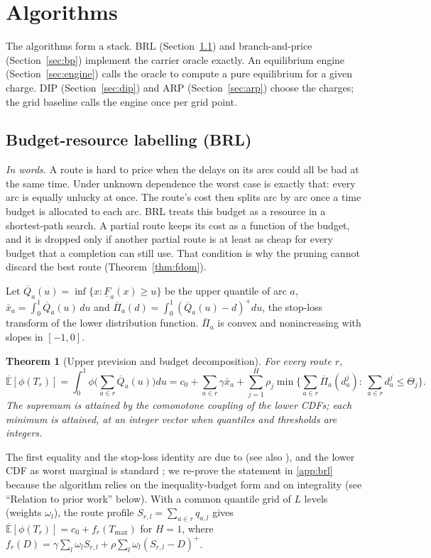 \documentclass[preprint,12pt]{elsarticle}
\newtheorem{theorem}{Theorem}
\theoremstyle{definition}
\theoremstyle{remark}
\newcommand{\Eu}{\overline{\mathbb{E}}}
\newcommand{\Qb}{\overline{Q}}
\newcommand{\Fl}{\underline{F}}
\newcommand{\Pib}{\overline{\Pi}}
\newcommand{\xb}{\bar x}
\newcommand{\pos}[1]{\left(#1\right)^{+}}
\begin{document}
\section{Algorithms}\label{sec:algo}

The algorithms form a stack. BRL (Section~\ref{sec:brl}) and branch-and-price (Section~\ref{sec:bp}) implement the carrier oracle exactly. An equilibrium engine (Section~\ref{sec:engine}) calls the oracle to compute a pure equilibrium for a given charge. DIP (Section~\ref{sec:dip}) and ARP (Section~\ref{sec:arp}) choose the charges; the grid baseline calls the engine once per grid point.

\subsection{Budget-resource labelling (BRL)}\label{sec:brl}

\emph{In words.} A route is hard to price when the delays on its arcs could all be bad at the same time. Under unknown dependence the worst case is exactly that: every arc is equally unlucky at once. The route's cost then splits arc by arc once a time budget is allocated to each arc. BRL treats this budget as a resource in a shortest-path search. A partial route keeps its cost as a function of the budget, and it is dropped only if another partial route is at least as cheap for every budget that a completion can still use. That condition is why the pruning cannot discard the best route (Theorem~\ref{thm:fdom}).

Let $\Qb_a(u)=\inf\{x:\Fl_a(x)\ge u\}$ be the upper quantile of arc $a$, $\xb_a=\int_0^1\Qb_a(u)\,du$ and $\Pib_a(d)=\int_0^1\pos{\Qb_a(u)-d}du$, the stop-loss transform of the lower distribution function. $\Pib_a$ is convex and nonincreasing with slopes in $[-1,0]$.

\begin{theorem}[Upper prevision and budget decomposition]\label{thm:brl-main}
For every route $r$,
\[
\Eu[\phi(T_r)]=\int_0^1\phi\Big(\sum_{a\in r}\Qb_a(u)\Big)du
=c_0+\sum_{a\in r}\gamma\xb_a+\sum_{j=1}^{H}\rho_j\min\Big\{\sum_{a\in r}\Pib_a(d^j_a):\ \sum_{a\in r}d^j_a\le\Theta_j\Big\}.
\]
The supremum is attained by the comonotone coupling of the lower CDFs; each minimum is attained, at an integer vector when quantiles and thresholds are integers.
\end{theorem}

The first equality and the stop-loss identity are due to \citet{Meilijson1979} (see also \citealp{Kaas2000,Dhaene2002}), and the lower CDF as worst marginal is standard \citep{Williamson1990}; we re-prove the statement in \ref{app:brl} because the algorithm relies on the inequality-budget form and on integrality (see ``Relation to prior work'' below). With a common quantile grid of $L$ levels (weights $\omega_l$), the route profile $S_{r,l}=\sum_{a\in r}q_{a,l}$ gives $\Eu[\phi(T_r)]=c_0+f_r(T_{\max})$ for $H=1$, where $f_r(D)=\gamma\sum_l\omega_lS_{r,l}+\rho\sum_l\omega_l\pos{S_{r,l}-D}$.
\end{document}
